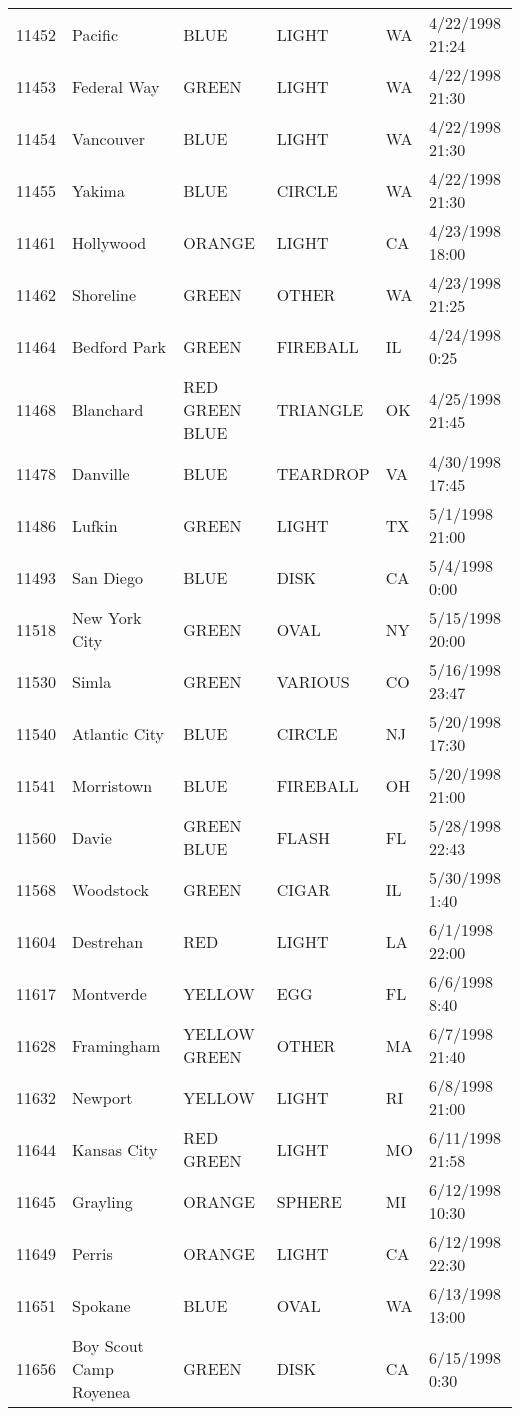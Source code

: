\begin{tabular}{llllll}
11452 & Pacific & BLUE & LIGHT & WA & 4/22/1998 21:24 \\
11453 & Federal Way & GREEN & LIGHT & WA & 4/22/1998 21:30 \\
11454 & Vancouver & BLUE & LIGHT & WA & 4/22/1998 21:30 \\
11455 & Yakima & BLUE & CIRCLE & WA & 4/22/1998 21:30 \\
11461 & Hollywood & ORANGE & LIGHT & CA & 4/23/1998 18:00 \\
11462 & Shoreline & GREEN & OTHER & WA & 4/23/1998 21:25 \\
11464 & Bedford Park & GREEN & FIREBALL & IL & 4/24/1998 0:25 \\
11468 & Blanchard & RED GREEN BLUE & TRIANGLE & OK & 4/25/1998 21:45 \\
11478 & Danville & BLUE & TEARDROP & VA & 4/30/1998 17:45 \\
11486 & Lufkin & GREEN & LIGHT & TX & 5/1/1998 21:00 \\
11493 & San Diego & BLUE & DISK & CA & 5/4/1998 0:00 \\
11518 & New York City & GREEN & OVAL & NY & 5/15/1998 20:00 \\
11530 & Simla & GREEN & VARIOUS & CO & 5/16/1998 23:47 \\
11540 & Atlantic City & BLUE & CIRCLE & NJ & 5/20/1998 17:30 \\
11541 & Morristown & BLUE & FIREBALL & OH & 5/20/1998 21:00 \\
11560 & Davie & GREEN BLUE & FLASH & FL & 5/28/1998 22:43 \\
11568 & Woodstock & GREEN & CIGAR & IL & 5/30/1998 1:40 \\
11604 & Destrehan & RED & LIGHT & LA & 6/1/1998 22:00 \\
11617 & Montverde & YELLOW & EGG & FL & 6/6/1998 8:40 \\
11628 & Framingham & YELLOW GREEN & OTHER & MA & 6/7/1998 21:40 \\
11632 & Newport & YELLOW & LIGHT & RI & 6/8/1998 21:00 \\
11644 & Kansas City & RED GREEN & LIGHT & MO & 6/11/1998 21:58 \\
11645 & Grayling & ORANGE & SPHERE & MI & 6/12/1998 10:30 \\
11649 & Perris & ORANGE & LIGHT & CA & 6/12/1998 22:30 \\
11651 & Spokane & BLUE & OVAL & WA & 6/13/1998 13:00 \\
11656 & Boy Scout Camp Royenea & GREEN & DISK & CA & 6/15/1998 0:30 \\

\end{tabular}
